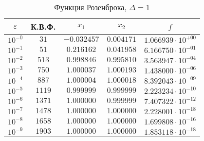 \documentclass[a4paper,12pt,notitlepage,pdftex,headsepline]{scrartcl}
\begin{document}
        \begin{table}[ht]
          \centering
          \caption{Функция Розенброка, $\Delta = 1$}
          \begin{tabular}{|c|c|c|c|c|}
            \hline
            $\varepsilon$ & К.В.Ф. & $x_1$ & $x_2$ & $f$\\
            \hline
            $10^{-0}$ & $31$ & $-0.032457$ & $0.004171$ & $1.066939\cdot 10^{+00}$\\
            $10^{-1}$ & $51$ & $0.216162$ & $0.041958$ & $6.166750\cdot 10^{-01}$\\
            $10^{-2}$ & $513$ & $0.998846$ & $0.995810$ & $3.563947\cdot 10^{-04}$\\
            $10^{-3}$ & $750$ & $1.000037$ & $1.000193$ & $1.438000\cdot 10^{-06}$\\
            $10^{-4}$ & $887$ & $1.000004$ & $1.000018$ & $8.392043\cdot 10^{-09}$\\
            $10^{-5}$ & $1119$ & $0.999999$ & $0.999999$ & $2.223234\cdot 10^{-10}$\\
            $10^{-6}$ & $1371$ & $1.000000$ & $0.999999$ & $7.407322\cdot 10^{-12}$\\
            $10^{-7}$ & $1478$ & $1.000000$ & $1.000000$ & $2.228001\cdot 10^{-18}$\\
            $10^{-8}$ & $1658$ & $1.000000$ & $1.000000$ & $1.699808\cdot 10^{-16}$\\
            $10^{-9}$ & $1903$ & $1.000000$ & $1.000000$ & $1.853118\cdot 10^{-18}$\\
            \hline
          \end{tabular}
        \end{table}
\end{document}

